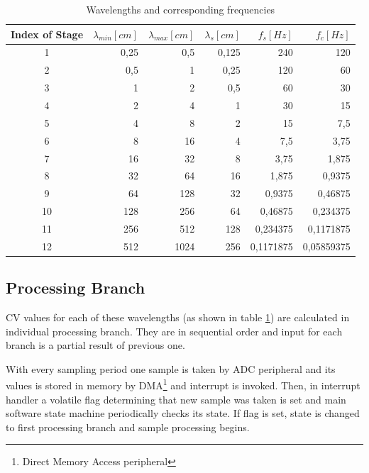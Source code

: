 \documentclass[twoside]{ctuthesis}
\theoremstyle{plain}
\theoremstyle{definition}
\theoremstyle{note}
\begin{document}
\begin{table}[htbp]
	\centering
	\caption{Wavelengths and corresponding frequencies}
	\begin{tabular}{crrrrr}
		\toprule
		Index of Stage & $\lambda_{min} [cm]$ & $\lambda_{max} [cm]$ & $\lambda_{s} [cm]$ & $f_s [Hz]$ & $f_c [Hz]$ \\
		\midrule
    1     & 0,25  & 0,5   & 0,125 & 240   & 120 \\
    2     & 0,5   & 1     & 0,25  & 120   & 60 \\
    3     & 1     & 2     & 0,5   & 60    & 30 \\
    4     & 2     & 4     & 1     & 30    & 15 \\
    5     & 4     & 8     & 2     & 15    & 7,5 \\
    6     & 8     & 16    & 4     & 7,5   & 3,75 \\
    7     & 16    & 32    & 8     & 3,75  & 1,875 \\
    8     & 32    & 64    & 16    & 1,875 & 0,9375 \\
    9     & 64    & 128   & 32    & 0,9375 & 0,46875 \\
    10    & 128   & 256   & 64    & 0,46875 & 0,234375 \\
    11    & 256   & 512   & 128   & 0,234375 & 0,1171875 \\
    12    & 512   & 1024  & 256   & 0,1171875 & 0,05859375 \\

		\bottomrule
	\end{tabular}%
	\label{tab:Wavelengths}%
\end{table}%

\subsection{Processing Branch}
CV values for each of these wavelengths (as shown in table \ref{tab:Wavelengths}) are calculated in individual processing branch. They are in sequential order and input for each branch is a partial result of previous one.

With every sampling period one sample is taken by ADC peripheral and its values is stored in memory by DMA\footnote{Direct Memory Access peripheral} and interrupt is invoked. Then, in interrupt handler a volatile flag determining that new sample was taken is set and main software state machine periodically checks its state. If flag is set, state is changed to first processing branch and sample processing begins.
\end{document}
